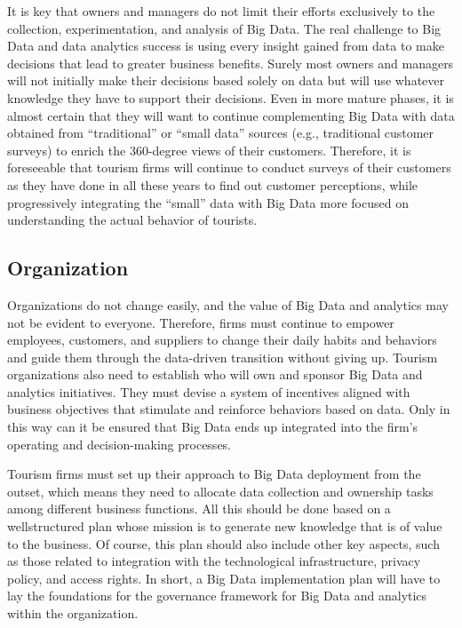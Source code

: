 \documentclass[
  letterpaper,
  DIV=11,
  numbers=noendperiod]{scrreprt}
\begin{document}
It is key that owners and managers do not limit their efforts
exclusively to the collection, experimentation, and analysis of Big
Data. The real challenge to Big Data and data analytics success is using
every insight gained from data to make decisions that lead to greater
business benefits. Surely most owners and managers will not initially
make their decisions based solely on data but will use whatever
knowledge they have to support their decisions. Even in more mature
phases, it is almost certain that they will want to continue
complementing Big Data with data obtained from ``traditional'' or
``small data'' sources (e.g., traditional customer surveys) to enrich
the 360-degree views of their customers. Therefore, it is foreseeable
that tourism firms will continue to conduct surveys of their customers
as they have done in all these years to find out customer perceptions,
while progressively integrating the ``small'' data with Big Data more
focused on understanding the actual behavior of tourists.

\hypertarget{organization}{%
\subsection{Organization}\label{organization}}

Organizations do not change easily, and the value of Big Data and
analytics may not be evident to everyone. Therefore, firms must continue
to empower employees, customers, and suppliers to change their daily
habits and behaviors and guide them through the data-driven transition
without giving up. Tourism organizations also need to establish who will
own and sponsor Big Data and analytics initiatives. They must devise a
system of incentives aligned with business objectives that stimulate and
reinforce behaviors based on data. Only in this way can it be ensured
that Big Data ends up integrated into the firm's operating and
decision-making processes.

Tourism firms must set up their approach to Big Data deployment from the
outset, which means they need to allocate data collection and ownership
tasks among different business functions. All this should be done based
on a wellstructured plan whose mission is to generate new knowledge that
is of value to the business. Of course, this plan should also include
other key aspects, such as those related to integration with the
technological infrastructure, privacy policy, and access rights. In
short, a Big Data implementation plan will have to lay the foundations
for the governance framework for Big Data and analytics within the
organization.
\end{document}
